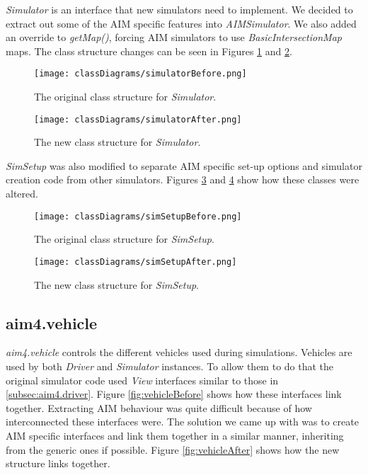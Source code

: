 \emph{Simulator} is an interface that new simulators need to implement. We decided to extract out some of the AIM specific features into \emph{AIMSimulator}. We also added an override to \emph{getMap()}, forcing AIM simulators to use \emph{BasicIntersectionMap} maps. The class structure changes can be seen in Figures \ref{fig:simulatorBefore} and \ref{fig:simulatorAfter}.

\begin{figure}[htb]
\texttt{[image: classDiagrams/simulatorBefore.png]}
\caption{The original class structure for \emph{Simulator}.}
\label{fig:simulatorBefore}
\end{figure}

\begin{figure}[htb]
\texttt{[image: classDiagrams/simulatorAfter.png]}
\caption{The new class structure for \emph{Simulator}.}
\label{fig:simulatorAfter}
\end{figure}

\emph{SimSetup} was also modified to separate AIM specific set-up options and simulator creation code from other simulators. Figures \ref{fig:simSetupBefore} and \ref{fig:simSetupAfter} show how these classes were altered.

\begin{figure}[htb]
\texttt{[image: classDiagrams/simSetupBefore.png]}
\caption{The original class structure for \emph{SimSetup}.}
\label{fig:simSetupBefore}
\end{figure}

\begin{figure}[htb]
\texttt{[image: classDiagrams/simSetupAfter.png]}
\caption{The new class structure for \emph{SimSetup}.}
\label{fig:simSetupAfter}
\end{figure}

\subsection{aim4.vehicle}
\label{subsec:aim4.vehicle}
\emph{aim4.vehicle} controls the different vehicles used during simulations. Vehicles are used by both \emph{Driver} and \emph{Simulator} instances. To allow them to do that the original simulator code used \emph{View} interfaces similar to those in \ref{subsec:aim4.driver}. Figure \ref{fig:vehicleBefore} shows how these interfaces link together. Extracting AIM behaviour was quite difficult because of how interconnected these interfaces were. The solution we came up with was to create AIM specific interfaces and link them together in a similar manner, inheriting from the generic ones if possible. Figure \ref{fig:vehicleAfter} shows how the new structure links together.

